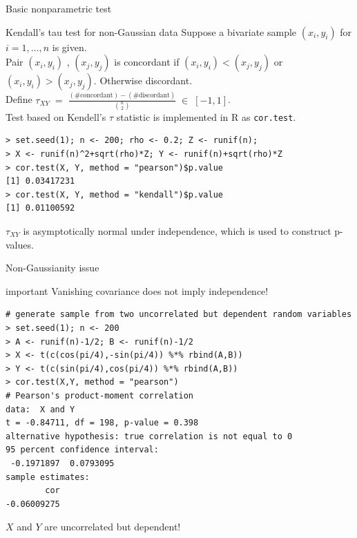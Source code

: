 \documentclass[11pt,handout,aspectratio=169,dvipsnames]{beamer}
\begin{document}
\begin{frame}[fragile,label=tau]{Basic nonparametric test}
\begin{block}{Kendall's tau test for non-Gaussian data}
Suppose a bivariate sample $(x_i,y_i)$ for $i=1,\ldots,n$ is given.\\[.2cm]
Pair $(x_i,y_i)$ , $(x_j,y_j)$ is \alert{concordant} if $(x_i,y_i)< (x_j,y_j)$ or $(x_i,y_i)> (x_j,y_j)$. Otherwise  \alert{discordant}.\\[.2cm]
Define $\tau_{XY}\;=\;\tfrac{(\#\mbox{concordant})-(\#\mbox{discordant})}{{n\choose 2}}\;\in\;  [-1,1]$.\\[.2cm]
Test based on Kendell's $\tau$ statistic is implemented in \textsc{R} as \texttt{cor.test}.
   \begin{lstlisting}
> set.seed(1); n <- 200; rho <- 0.2; Z <- runif(n); 
> X <- runif(n)^2+sqrt(rho)*Z; Y <- runif(n)+sqrt(rho)*Z
> cor.test(X, Y, method = "pearson")$p.value
[1] 0.03417231
> cor.test(X, Y, method = "kendall")$p.value
[1] 0.01100592
 \end{lstlisting}
\end{block}
$\tau_{XY}$ is asymptotically normal under independence, which is used to construct p-values.
\end{frame}


\begin{frame}[fragile]{Non-Gaussianity issue}
\begin{beamercolorbox}[wd=\paperwidth,sep=5pt]{important}
Vanishing covariance does not imply independence!
\end{beamercolorbox}
\begin{lstlisting}
# generate sample from two uncorrelated but dependent random variables
> set.seed(1); n <- 200
> A <- runif(n)-1/2; B <- runif(n)-1/2
> X <- t(c(cos(pi/4),-sin(pi/4)) %*% rbind(A,B))
> Y <- t(c(sin(pi/4),cos(pi/4)) %*% rbind(A,B))
> cor.test(X,Y, method = "pearson")
# Pearson's product-moment correlation
data:  X and Y
t = -0.84711, df = 198, p-value = 0.398
alternative hypothesis: true correlation is not equal to 0
95 percent confidence interval:
 -0.1971897  0.0793095
sample estimates:
        cor 
-0.06009275 \end{lstlisting}
$X$ and $Y$ are uncorrelated but dependent!
\end{frame}
\end{document}
